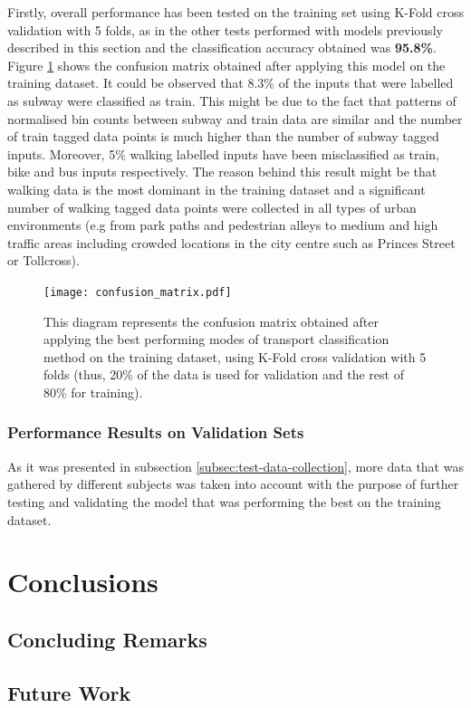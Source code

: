 \documentclass[bsc,frontabs,twoside,singlespacing,parskip,deptreport]{infthesis}     %
\begin{document}
Firstly, overall performance has been tested on the training set using K-Fold cross validation with 5 folds, as in the other tests performed with models previously described in this section and the classification accuracy obtained was \textbf{95.8\%}. Figure \ref{fig:confusion_matrix} shows the confusion matrix obtained after applying this model on the training dataset. It could be observed that 8.3\% of the inputs that were labelled as subway were classified as train. This might be due to the fact that patterns of normalised bin counts between subway and train data are similar and the number of train tagged data points is much higher than the number of subway tagged inputs. Moreover, 5\% walking labelled inputs have been misclassified as train, bike and bus inputs respectively. The reason behind this result might be that walking data is the most dominant in the training dataset and a significant number of walking tagged data points were collected in all types of urban environments (e.g from park paths and pedestrian alleys to medium and high traffic areas including crowded locations in the city centre such as Princes Street or Tollcross).

\begin{figure}[h!]
  \center
  \texttt{[image: confusion\_matrix.pdf]}
  \caption{This diagram represents the confusion matrix obtained after applying the best performing modes of transport classification method on the training dataset, using K-Fold cross validation with 5 folds (thus, 20\% of the data is used for validation and the rest of 80\% for training).}
  \label{fig:confusion_matrix}
\end{figure}


\subsection{Performance Results on Validation Sets}

As it was presented in subsection \ref{subsec:test-data-collection}, more data that was gathered by different subjects was taken into account with the purpose of further testing and validating the model that was performing the best on the training dataset.



\chapter{Conclusions}

\section{Concluding Remarks}

\section{Future Work}




\end{document}
